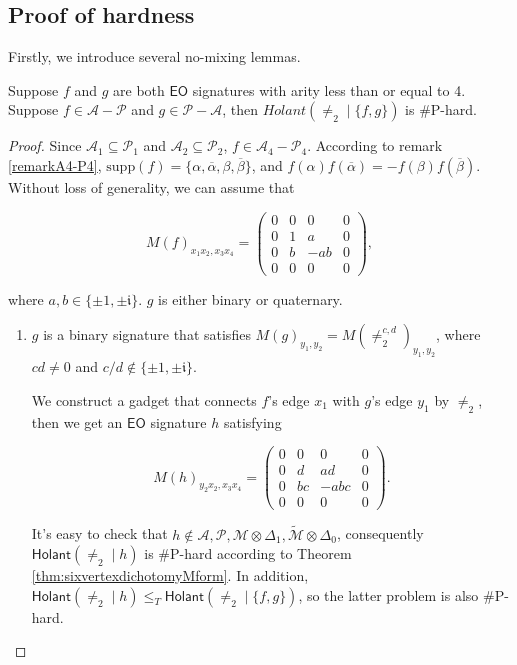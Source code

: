 \documentclass[a4paper,UKenglish,cleveref, autoref, thm-restate]{lipics-v2021}
\newcommand{\bi}[2]{\neq_2^{#1,#2}}
\newcommand{\hol}[0]{\textsf{Holant}}
\newcommand{\eo}[0]{\textsf{EO}}
\newcommand{\su}[0]{\text{supp}}
\begin{document}
\subsection{Proof of hardness}\label{subsection:4aritysethardness}
Firstly, we introduce several no-mixing lemmas.


\begin{lemma}\label{lem:mixAPhard}
Suppose $f$ and $g$ are both $\eo$ signatures with arity less than or equal to 4. Suppose $f\in\mathscr{A}-\mathscr{P}$ and $g\in\mathscr{P}-\mathscr{A}$, then $Holant(\neq_2\mid\{f,g\})$ is \#P-hard.
\end{lemma}

\begin{proof}
Since $\mathscr{A}_1\subseteq\mathscr{P}_1$ and $\mathscr{A}_2\subseteq\mathscr{P}_2$, $f\in\mathscr{A}_4-\mathscr{P}_4$. According to remark \ref{remarkA4-P4}, $\su(f)=\{\alpha,\overline{\alpha},\beta,\overline{\beta}\}$, and $f(\alpha)f(\overline{\alpha})=-f(\beta)f(\overline{\beta})$. Without loss of generality, we can assume that 

$$M(f)_{x_1x_2,x_3x_4}=\left(\begin{array}{cccc}
0 & 0 & 0 & 0\\
0 & 1 & a & 0\\
0 & b & -ab & 0\\
0 & 0 & 0 & 0
\end{array} 
\right),$$

where $a,b\in\{\pm1,\pm\mathfrak{i}\}$. $g$ is either binary or quaternary.

\begin{enumerate}

\item $g$ is a binary signature that satisfies $M(g)_{y_1,y_2}=M(\bi{c}{d})_{y_1,y_2}$, where $cd\neq 0$ and $c/d\notin\{\pm1,\pm \mathfrak{i}\}$.

We construct a gadget that connects $f$'s edge $x_1$ with $g$'s edge $y_1$ by $\neq_2$, then we get an $\eo$ signature $h$ satisfying

$$M(h)_{y_2x_2,x_3x_4}=\left(\begin{array}{cccc}
0 & 0 & 0 & 0\\
0 & d & ad & 0\\
0 & bc & -abc & 0\\
0 & 0 & 0 & 0
\end{array} 
\right).$$ 

It's easy to check that $h\notin\mathscr{A},\mathscr{P},\mathscr{M}\otimes\Delta_1,\widetilde{\mathscr{M}}\otimes\Delta_0$, consequently $\hol(\neq_2\mid h)$ is \#P-hard according to Theorem \ref{thm:sixvertexdichotomyMform}. In addition, $\hol(\neq_2\mid h)\leq_T\hol(\neq_2\mid\{f,g\})$, so the latter problem is also \#P-hard.


\end{enumerate}
\end{proof}
\end{document}
